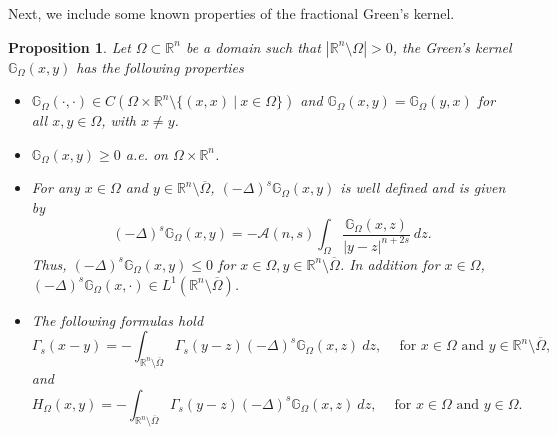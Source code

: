 \documentclass{amsart}
\newtheorem{remark}[theorem]{Remark}
\newtheorem{proposition}[theorem]{Proposition}
\newcommand{\R}{\mathbb{R}}
\newcommand{\slap}{(-\Delta)^{s}}
\newcommand{\rn}{\mathbb{R}^{n}}
\newcommand{\gk}[1]{\mathbb{G}_{#1}}
\begin{document}
Next, we include some known properties of the fractional Green's kernel. 
\begin{proposition}\label{prop greens kernal continuity}
   Let $\Omega\subset \R^{n}$ be a domain such that $|\R^{n}\setminus\Omega|>0$, the Green's kernel $\gk{\Omega}(x,y)$ has the following properties
   \begin{itemize}
       \item[(i)] $\gk{\Omega}(\cdot,\cdot)\in C(\Omega\times\rn\setminus\{(x,x)~|~x\in \Omega\})$ and $\gk{\Omega}(x,y)=\gk{\Omega}(y,x)$ for all $x,y\in\Omega$, with $x\neq y$. 
       \smallskip 
       
       \item[(ii)] $\gk{\Omega}(x,y)\geq 0$ a.e. on $\Omega\times\rn$. 
       \smallskip 
       
       \item[(iii)] For any $x\in\Omega$ and $y\in \R^{n}\setminus\overline{\Omega}$, $\slap\gk{\Omega}(x,y)$ is well defined and is given by 
       \begin{equation*}
           \slap\gk{\Omega}(x,y)=-\mathcal{A}(n,s)\int_{\Omega}\frac{\gk{\Omega}(x,z)}{|y-z|^{n+2s}}\ dz.
       \end{equation*} 
       Thus, $\slap\gk{\Omega}(x,y)\leq 0$ for $x\in \Omega, y\in \R^{n}\setminus\overline{\Omega}$. In addition for $x\in \Omega$, $\slap \gk{\Omega}(x,\cdot)\in L^{1}(\R^{n}\setminus\overline{\Omega})$. 
       \smallskip
       
       \item[(iv)] The following formulas hold 
     \begin{equation*}
           \Gamma_{s}(x-y)=-\int_{\R^{n}\setminus\overline{\Omega}}\Gamma_{s}(y-z)\slap\gk{\Omega}(x,z)\ dz, \quad ~ \text{for }x\in \Omega\text{ and } y\in \R^{n}\setminus\overline{\Omega},
       \end{equation*} 
       and 
       \begin{equation*}
           H_{\Omega}(x,y)=-\int_{\R^{n}\setminus\overline{\Omega}}\Gamma_{s}(y-z)\slap\gk{\Omega}(x,z)\ dz, \quad ~\text{for }x\in \Omega\text{ and }y\in \Omega.
       \end{equation*}
       \smallskip 
       

\end{itemize}
\end{proposition}
\end{document}
